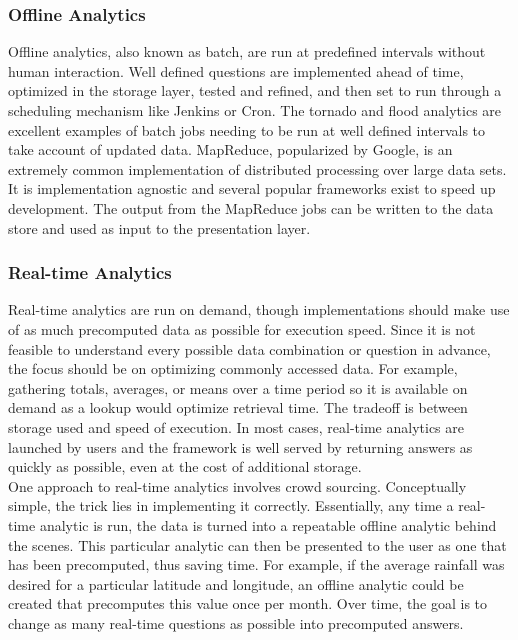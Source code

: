 \subsubsection{Offline Analytics}
Offline analytics, also known as batch, are run at predefined intervals without human interaction. Well defined questions are implemented ahead of time, optimized in the storage layer, tested and refined, and then set to run through a scheduling mechanism like Jenkins or Cron. The tornado and flood analytics are excellent examples of batch jobs needing to be run at well defined intervals to take account of updated data. MapReduce, popularized by Google, is an extremely common implementation of distributed processing over large data sets. It is implementation agnostic and several popular frameworks exist to speed up development. The output from the MapReduce jobs can be written to the data store and used as input to the presentation layer.
\subsubsection{Real-time Analytics}
Real-time analytics are run on demand, though implementations should make use of as much precomputed data as possible for execution speed. Since it is not feasible to understand every possible data combination or question in advance, the focus should be on optimizing commonly accessed data. For example, gathering totals, averages, or means over a time period so it is available on demand as a lookup would optimize retrieval time. The tradeoff is between storage used and speed of execution. In most cases, real-time analytics are launched by users and the framework is well served by returning answers as quickly as possible, even at the cost of additional storage.\\

One approach to real-time analytics involves crowd sourcing. Conceptually simple, the trick lies in implementing it correctly. Essentially, any time a real-time analytic is run, the data is turned into a repeatable offline analytic behind the scenes. This particular analytic can then be presented to the user as one that has been precomputed, thus saving time. For example, if the average rainfall was desired for a particular latitude and longitude, an offline analytic could be created that precomputes this value once per month. Over time, the goal is to change as many real-time questions as possible into precomputed answers.
